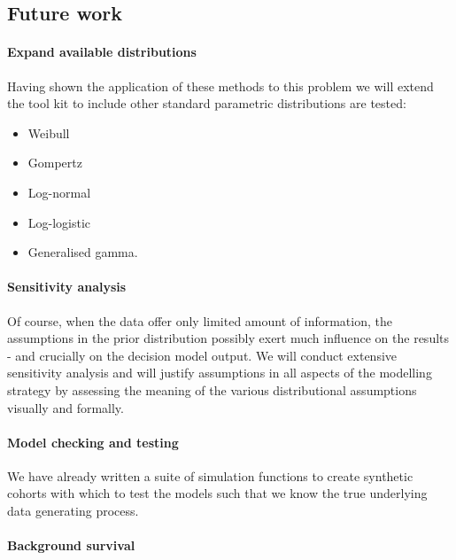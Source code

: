 \documentclass[
]{article}
\providecommand{\tightlist}{%
  \setlength{\itemsep}{0pt}\setlength{\parskip}{0pt}}
\begin{document}
\hypertarget{future-work}{%
\subsection{Future work}\label{future-work}}

\hypertarget{expand-available-distributions}{%
\paragraph{Expand available
distributions}\label{expand-available-distributions}}

Having shown the application of these methods to this problem we will
extend the tool kit to include other standard parametric distributions
are tested:

\begin{itemize}
\tightlist
\item
  Weibull
\item
  Gompertz
\item
  Log-normal
\item
  Log-logistic
\item
  Generalised gamma.
\end{itemize}

\hypertarget{sensitivity-analysis}{%
\paragraph{Sensitivity analysis}\label{sensitivity-analysis}}

Of course, when the data offer only limited amount of information, the
assumptions in the prior distribution possibly exert much influence on
the results - and crucially on the decision model output. We will
conduct extensive sensitivity analysis and will justify assumptions in
all aspects of the modelling strategy by assessing the meaning of the
various distributional assumptions visually and formally.

\hypertarget{model-checking-and-testing}{%
\paragraph{Model checking and
testing}\label{model-checking-and-testing}}

We have already written a suite of simulation functions to create
synthetic cohorts with which to test the models such that we know the
true underlying data generating process.

\hypertarget{background-survival-1}{%
\paragraph{Background survival}\label{background-survival-1}}
\end{document}
